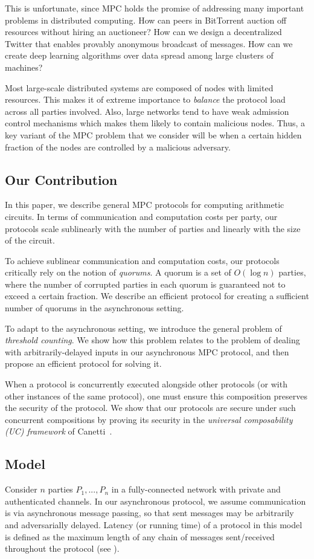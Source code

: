 \documentclass[11pt,letter]{article}
\theoremstyle{mytheoremstyle}
\begin{document}
This is unfortunate, since MPC holds the promise of addressing many important problems in distributed computing. How can peers in BitTorrent auction off resources without hiring an auctioneer? How can we design a decentralized Twitter that enables provably anonymous broadcast of messages. How can we create deep learning algorithms over data spread among large clusters of machines?

Most large-scale distributed systems are composed of nodes with limited resources. This makes it of extreme importance to \emph{balance} the protocol load across all parties involved. Also, large networks tend to have weak admission control mechanisms which makes them likely to contain malicious nodes. Thus, a key variant of the MPC problem that we consider will be when a certain hidden fraction of the nodes are controlled by a malicious adversary.

\subsection{Our Contribution} \label{sec:contribution}
In this paper, we describe general MPC protocols for computing arithmetic circuits. In terms of communication and computation costs per party, our protocols scale sublinearly with the number of parties and linearly with the size of the circuit. 

To achieve sublinear communication and computation costs, our protocols critically rely on the notion of \emph{quorums}. A quorum is a set of $O(\log{n})$ parties, where the number of corrupted parties in each quorum is guaranteed not to exceed a certain fraction. We describe an efficient protocol for creating a sufficient number of quorums in the asynchronous setting.

To adapt to the asynchronous setting, we introduce the general problem of \emph{threshold counting}. We show how this problem relates to the problem of dealing with arbitrarily-delayed inputs in our asynchronous MPC protocol, and then propose an efficient protocol for solving it.

When a protocol is concurrently executed alongside other protocols (or with other instances of the same protocol), one must ensure this composition preserves the security of the protocol. We show that our protocols are secure under such concurrent compositions by proving its security in the \emph{universal composability (UC) framework} of Canetti~\cite{Canetti:UCSecurity:2001}.

\subsection{Model} \label{sec:model}
Consider $n$ parties $P_1,...,P_n$ in a fully-connected network with private and authenticated channels.
In our asynchronous protocol, we assume communication is via asynchronous message passing, so that sent messages may be arbitrarily and adversarially delayed. Latency (or running time) of a protocol in this model is defined as the maximum length of any chain of messages sent/received throughout the protocol (see \cite{CD,Attiya:DC:2004}).
\end{document}
